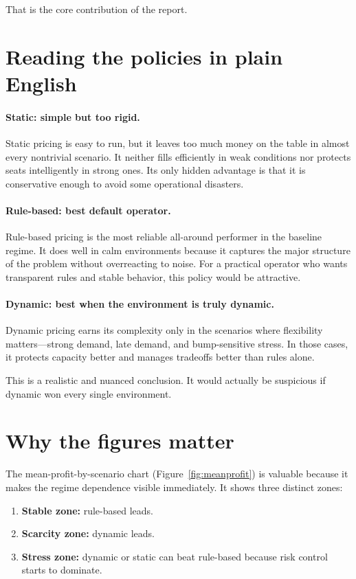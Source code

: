 \documentclass[11pt,a4paper]{article}
\begin{document}
That is the core contribution of the report.

\section{Reading the policies in plain English}

\paragraph{Static: simple but too rigid.} Static pricing is easy to run, but it leaves too much money on the table in almost every nontrivial scenario. It neither fills efficiently in weak conditions nor protects seats intelligently in strong ones. Its only hidden advantage is that it is conservative enough to avoid some operational disasters.

\paragraph{Rule-based: best default operator.} Rule-based pricing is the most reliable all-around performer in the baseline regime. It does well in calm environments because it captures the major structure of the problem without overreacting to noise. For a practical operator who wants transparent rules and stable behavior, this policy would be attractive.

\paragraph{Dynamic: best when the environment is truly dynamic.} Dynamic pricing earns its complexity only in the scenarios where flexibility matters---strong demand, late demand, and bump-sensitive stress. In those cases, it protects capacity better and manages tradeoffs better than rules alone.

This is a realistic and nuanced conclusion. It would actually be suspicious if dynamic won every single environment.

\section{Why the figures matter}

The mean-profit-by-scenario chart (Figure~\ref{fig:meanprofit}) is valuable because it makes the regime dependence visible immediately. It shows three distinct zones:
\begin{enumerate}
  \item \textbf{Stable zone:} rule-based leads.
  \item \textbf{Scarcity zone:} dynamic leads.
  \item \textbf{Stress zone:} dynamic or static can beat rule-based because risk control starts to dominate.
\end{enumerate}
\end{document}
